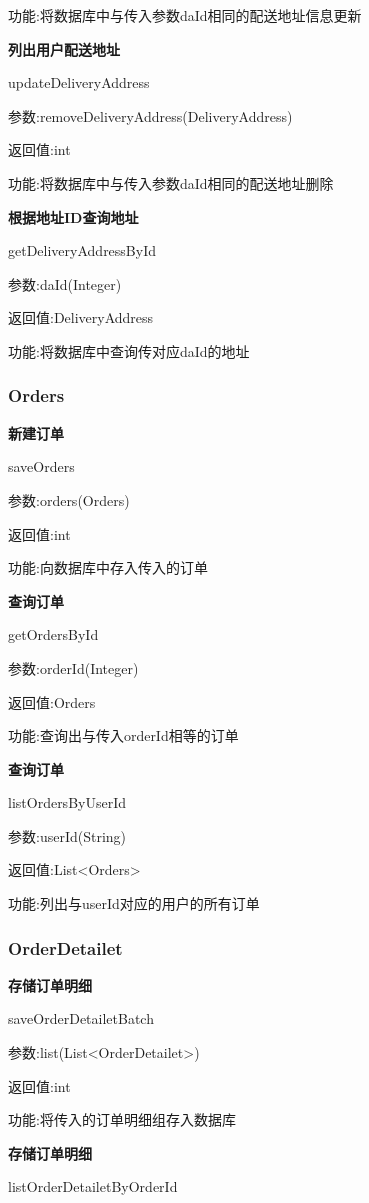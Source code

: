功能:将数据库中与传入参数daId相同的配送地址信息更新


\textbf{列出用户配送地址}

updateDeliveryAddress

参数:removeDeliveryAddress(DeliveryAddress)

返回值:int

功能:将数据库中与传入参数daId相同的配送地址删除

\textbf{根据地址ID查询地址}

getDeliveryAddressById

参数:daId(Integer)

返回值:DeliveryAddress

功能:将数据库中查询传对应daId的地址

\subsubsection{Orders}

\textbf{新建订单}

saveOrders

参数:orders(Orders)

返回值:int

功能:向数据库中存入传入的订单

\textbf{查询订单}

getOrdersById

参数:orderId(Integer)

返回值:Orders

功能:查询出与传入orderId相等的订单

\textbf{查询订单}

listOrdersByUserId

参数:userId(String)

返回值:List<Orders>

功能:列出与userId对应的用户的所有订单

\subsubsection{OrderDetailet}

\textbf{存储订单明细}

saveOrderDetailetBatch

参数:list(List<OrderDetailet>) 

返回值:int

功能:将传入的订单明细组存入数据库

\textbf{存储订单明细}

listOrderDetailetByOrderId

